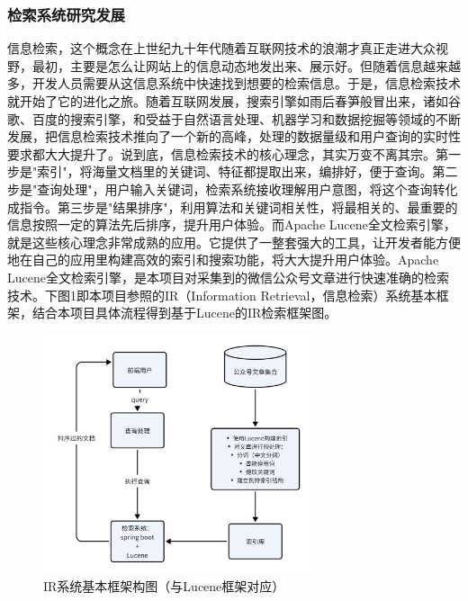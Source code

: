 \documentclass[a4paper,12pt]{ctexart}
\newcommand{\wuhao}{\fontsize{10.5pt}{15.75pt}\selectfont} %
\begin{document}
\subsubsection{检索系统研究发展}
\songti\wuhao
信息检索，这个概念在上世纪九十年代随着互联网技术的浪潮才真正走进大众视野，最初，主要是怎么让网站上的信息动态地发出来、展示好。但随着信息越来越多，开发人员需要从这信息系统中快速找到想要的检索信息。于是，信息检索技术就开始了它的进化之旅。随着互联网发展，搜索引擎如雨后春笋般冒出来，诸如谷歌、百度的搜索引擎，和受益于自然语言处理、机器学习和数据挖掘等领域的不断发展，把信息检索技术推向了一个新的高峰，处理的数据量级和用户查询的实时性要求都大大提升了。说到底，信息检索技术的核心理念，其实万变不离其宗\cite{ref6}。第一步是"索引"，将海量文档里的关键词、特征都提取出来，编排好，便于查询。第二步是"查询处理"，用户输入关键词，检索系统接收理解用户意图，将这个查询转化成指令。第三步是"结果排序"，利用算法和关键词相关性，将最相关的、最重要的信息按照一定的算法先后排序，提升用户体验。而Apache Lucene全文检索引擎，就是这些核心理念非常成熟的应用。它提供了一整套强大的工具，让开发者能方便地在自己的应用里构建高效的索引和搜索功能，将大大提升用户体验。Apache Lucene全文检索引擎，是本项目对采集到的微信公众号文章进行快速准确的检索技术\cite{ref9}。下图1即本项目参照的IR（Information Retrieval，信息检索）系统基本框架，结合本项目具体流程得到基于Lucene的IR检索框架图。

\begin{figure}[htbp]
    \centering
    \includegraphics[width=0.7\textwidth]{figures/whiteboard_exported_image.png}
    \caption{IR系统基本框架构图（与Lucene框架对应）}
    \label{fig:ir_system}
\end{figure}
\end{document}
